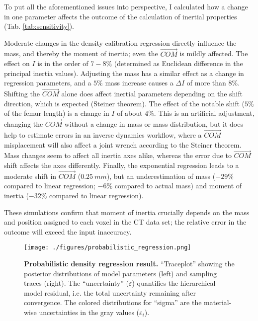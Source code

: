 \normalsize


To put all the aforementioned issues into perspective, I calculated how a change in one parameter affects the outcome of the calculation of inertial properties (Tab. \ref{tab:sensitivity}).

Moderate changes in the density calibration regression directly influence the mass, and thereby the moment of inertia; even the \(\vec{COM}\) is mildly affected.
The effect on \(I\) is in the order of \(7-8 \%\) (determined as Euclidean difference in the principal inertia values).
Adjusting the mass has a similar effect as a change in regression parameters, and a \(5 \%\) mass increase causes a \(\Delta I\) of more than \(8 \%\).
Shifting the \(\vec{COM}\) alone does affect inertial parameters depending on the shift direction, which is expected (Steiner theorem).
The effect of the notable shift (\(5 \%\) of the femur length) is a change in \(I\) of about \(4 \%\).
This is an artificial adjustment, changing the \(\vec{COM}\) without a change in mass or mass distribution, but it does help to estimate errors in an inverse dynamics workflow, where a \(\vec{COM}\) misplacement will also affect a joint wrench according to the Steiner theorem.
Mass changes seem to affect all inertia axes alike, whereas the error due to \(\vec{COM}\) shift affects the axes differently.
Finally, the exponential regression leads to a moderate shift in \(\vec{COM}\) (\(0.25\ mm\)), but an underestimation of mass (\(-29 \%\) compared to linear regression; \(-6 \%\) compared to actual mass) and moment of inertia (\(-32 \%\) compared to linear regression).

These simulations confirm that moment of inertia crucially depends on the mass and position assigned to each voxel in the CT data set; the relative error in the outcome will exceed the input inaccuracy.


\begin{figure}[p]
\centering
\texttt{[image: ./figures/probabilistic\_regression.png]}
\caption{\label{fig:probabilistic_density}\textbf{Probabilistic density regression result.} ``Traceplot'' showing the posterior distributions of model parameters (left) and sampling traces (right). The ``uncertainty'' (\(\varepsilon\)) quantifies the hierarchical model residual, i.e. the total uncertainty remaining after convergence. The colored distributions for ``sigma'' are the material-wise uncertainties in the gray values (\(\varepsilon_{i}\)).}
\end{figure}

